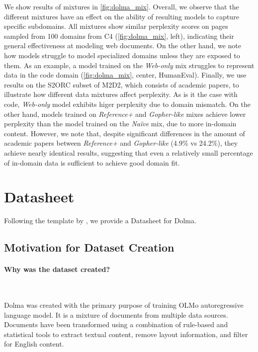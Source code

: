 \documentclass{article}
\newcommand{\dolma}{Dolma\xspace}
\newcommand{\olmo}{OLMo\xspace}
\begin{document}
We show results of mixtures in \autoref{fig:dolma_mix}. 
Overall, we observe that the different mixtures have an effect on the ability of resulting models to capture specific subdomains. 
All mixtures show similar perplexity scores on pages sampled from 100 domains from C4 (\autoref{fig:dolma_mix}, left), indicating their general effectiveness at modeling web documents.  
On the other hand, we note how models struggle to model specialized domains unless they are exposed to them. 
As an example, a model trained on the \textit{Web-only} mix struggles to represent data in the code domain (\autoref{fig:dolma_mix}, center, HumanEval).
Finally, we use results on the S2ORC subset of M2D2, which consists of academic papers, to illustrate how different data mixtures affect perplexity. 
As is it the case with code, \textit{Web-only} model exhibits higer perplexity due to domain mismatch. 
On the other hand, models trained on \textit{Reference+} and \textit{Gopher-like} mixes achieve lower perplexity than the model trained on the \textit{Na\"ive} mix, due to more in-domain content. 
However, we note that, despite significant differences in the amount of academic papers between \textit{Reference+} and \textit{Gopher-like} (4.9\% vs 24.2\%), they achieve nearly identical results, suggesting that even a relatively small percentage of in-domain data is sufficient to achieve good domain fit. 

\section{Datasheet}
\label{sec:datasheet}

Following the template by \citet{gebru2021datasheets}, we provide a Datasheet for \dolma.

\subsection{Motivation for Dataset Creation}

\paragraph{Why was the dataset created?}~ 

\dolma was created with the primary purpose of training \olmo autoregressive language model. It is a mixture of documents from multiple data sources. Documents have been transformed using a combination of rule-based and statistical tools to extract textual content, remove layout information, and filter for English content. 
\end{document}
